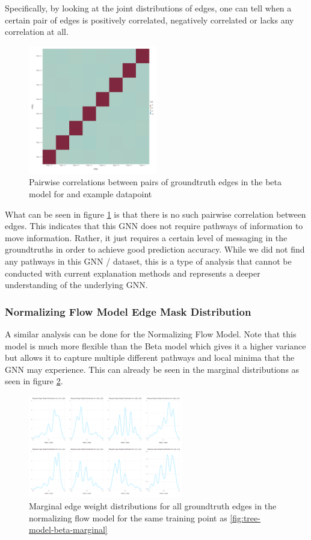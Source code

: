 Specifically, by looking at the joint distributions of edges, one can tell when a certain pair of edges is positively correlated, negatively correlated or lacks any correlation at all. 
\begin{figure}[htb]
	\centering
	\includegraphics[width=0.5\textwidth]{images/tree-model-beta-cor.pdf}
	\caption{Pairwise correlations between pairs of groundtruth edges in the beta model for and example datapoint}
	\label{fig:tree-model-beta-cor}
\end{figure}
What can be seen in figure \ref{fig:tree-model-beta-cor} is that there is no such pairwise correlation between edges. This indicates that this GNN does not require pathways of information to move information. Rather, it just requires a certain level of messaging in the groundtruths in order to achieve good prediction accuracy. While we did not find any pathways in this GNN / dataset, this is a type of analysis that cannot be conducted with current explanation methods and represents a deeper understanding of the underlying GNN.

\subsubsection{Normalizing Flow Model Edge Mask Distribution}
A similar analysis can be done for the Normalizing Flow Model. Note that this model is much more flexible than the Beta model which gives it a higher variance but allows it to capture multiple different pathways and local minima that the GNN may experience. This can already be seen in the marginal distributions as seen in figure \ref{fig:tree-model-dnfg-marginal}.
\begin{figure}[htb]
	\centering
	\includegraphics[width=0.6\textwidth]{images/tree-model-dnfg-marginal.pdf}
	\caption{Marginal edge weight distributions for all groundtruth edges in the normalizing flow model for the same training point as \ref{fig:tree-model-beta-marginal}}
	\label{fig:tree-model-dnfg-marginal}
\end{figure}

